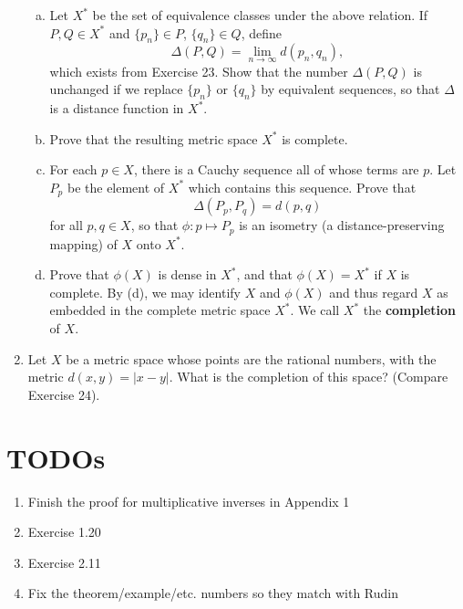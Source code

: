 \documentclass{scrbook}
\renewcommand{\to}{\rightarrow}
\begin{document}
\begin{enumerate}
\begin{enumerate}[(a)]
\item Let $X^*$ be the set of equivalence classes under the above relation. If $P, Q \in X^*$ and $\{p_n\} \in P$, $\{q_n\} \in Q$, define
\[
	\Delta(P, Q) = \lim_{n \to \infty} d(p_n, q_n),
\]
which exists from Exercise 23. Show that the number $\Delta(P, Q)$ is unchanged if we replace $\{p_n\}$ or $\{q_n\}$ by equivalent sequences, so that $\Delta$ is a distance function in $X^*$.

\item Prove that the resulting metric space $X^*$ is complete.

\item For each $p \in X$, there is a Cauchy sequence all of whose terms are $p$. Let $P_p$ be the element of $X^*$ which contains this sequence. Prove that
\[
	\Delta(P_p, P_q) = d(p, q)
\]
for all $p, q \in X$, so that $\phi: p \mapsto P_p$ is an isometry (a distance-preserving mapping) of $X$ onto $X^*$.

\item Prove that $\phi(X)$ is dense in $X^*$, and that $\phi(X) = X^*$ if $X$ is complete. By (d), we may identify $X$ and $\phi(X)$ and thus regard $X$ as embedded in the complete metric space $X^*$. We call $X^*$ the \textbf{completion} of $X$.
\end{enumerate}

\item %
Let $X$ be a metric space whose points are the rational numbers, with the metric $d(x, y) = |x - y|$. What is the completion of this space? (Compare Exercise 24).


\end{enumerate}


\chapter{TODOs}

\begin{enumerate}
\item Finish the proof for multiplicative inverses in Appendix 1
\item Exercise 1.20
\item Exercise 2.11
\item Fix the theorem/example/etc. numbers so they match with Rudin
\end{enumerate}
\end{document}
